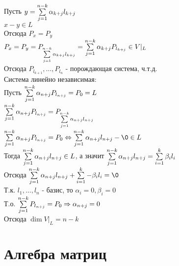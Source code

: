 \documentclass[12pt]{article}
\begin{document}
Пусть $y = \sum\limits_{j=1}^{n-k} \alpha_{k+j}l_{k+j}$\\
$x - y \in L$\\
Отсюда $P_x = P_y$\\
$P_x = P_y = P_{\sum\limits_{j=1}^{n-k} \alpha_{k+j}l_{k+j}} = \sum\limits_{j=1}^{n-k} \alpha_{k+j}P_{l_{k+j}} \in V|_L$\\
Отсюда $P_{l_{k+1}}, \ldots, P_{l_n}$ - порождающая система, ч.т.д.\\
Система линейно независимая:\\
Пусть $\sum\limits_{j=1}^{n-k} \alpha_{n+j} P_{l_{n+j}} = P_0 = L$\\
$\sum\limits_{j=1}^{n-k} \alpha_{n+j} P_{l_{n+j}} = P_{\sum\limits_{j=1}^{n-k} \alpha_{n+j} l_{n+j}}$\\
$\suml_{j=1}^{n-k} \alpha_{n+j} P_{l_{n+j}} = P_0 \Leftrightarrow \suml_{j=1}^{n-k} \alpha_{n+j} l_{n+j} - \0 \in L$\\
Тогда $\sum\limits_{j=1}^{n-k}\alpha_{n+j}  l_{n+j}\in L$, а значит $\sum\limits_{j=1}^{n-k} \alpha_{n+j} l_{n+j} = \sum\limits_{i=1}^k \beta_i l_i$\\
Отсюда $\suml_{j=1}^{n-k} \alpha_{n+j} l_{n+j} + \suml_{i=1}^k -\beta_i l_i = \0$\\
Т.к. $l_1,\ldots, l_n$ - базис, то $\alpha_i = 0, \beta_i = 0$\\
Т.о. $\sum\limits_{j=1}^{n-k} P_{l_{n+j}} = P_0 \Rightarrow \alpha_{n+j} = 0$\\
Отсюда $\dim V|_L = n-k$\\
\section{Алгебра матриц}
\end{document}
